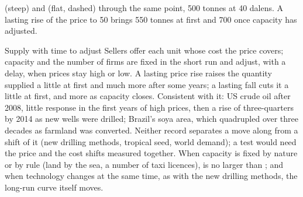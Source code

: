 \begin{omfigure}

{\small {} (steep) and  (flat, dashed) through the same point, 500 tonnes at 40 dalens. A lasting
rise of the price to 50 brings 550 tonnes at first and 700 once capacity has adjusted.}
\end{omfigure}

\begin{model}{Supply with time to adjust}
\assumes Sellers offer each unit whose cost the price covers; capacity and the number of firms are fixed in the short run and
  adjust, with a delay, when prices stay high or low.
\predicts A lasting price rise raises the quantity supplied a little at first and much more after some years; a lasting fall cuts
  it a little at first, and more as capacity closes.
\tested Consistent with it: US crude oil after 2008, little response in the first years of high prices, then a rise of
  three-quarters by 2014 as new wells were drilled; Brazil's soya area, which quadrupled over three decades as farmland was
  converted. Neither record separates a move along  from a shift of it (new drilling methods, tropical seed,
  world demand); a test would need the price and the cost shifts measured together.
\breaks When capacity is fixed by nature or by rule (land by the sea, a number of taxi licences),  is no larger than
  ; and when technology changes at the same time, as with the new drilling methods, the long-run curve itself moves.
\end{model}

